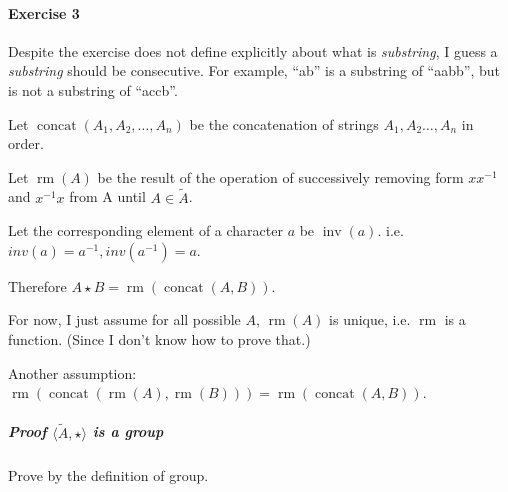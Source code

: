\documentclass[11pt]{article}
\begin{document}
\newpage
\paragraph{Exercise 3}

Despite the exercise does not define explicitly
about what is \textit{substring}, I guess a \textit{substring}
should be consecutive.
For example, ``ab'' is a substring of ``aabb'', but is not a substring of ``accb''.

Let $\mathop{concat}(A_1,A_2,\ldots,A_n)$ be the concatenation of strings
$A_1,A_2\ldots,A_n$ in order.

Let $\mathop{rm}(A)$ be the result of the operation of successively removing form $xx^{-1}$
and $x^{-1}x$ from A until $A \in \tilde{A}$.

Let the corresponding element of a character $a$ be $\mathop{inv}(a)$.
i.e. $inv(a) = a^{-1}, inv(a^{-1}) = a$.

Therefore $A \star B = \mathop{rm}(\mathop{concat}(A,B))$.

For now, I just assume for all possible $A$, $\mathop{rm}(A)$ is unique, i.e. $\mathop{rm}$
is a function. (Since I don't know how to prove that.)

Another assumption: $\mathop{rm}(\mathop{concat}(\mathop{rm}(A),\mathop{rm}(B)))
=\mathop{rm}(\mathop{concat}(A,B))$.

\subparagraph{Proof $\langle \tilde{A}, \star \rangle$ is a group}

Prove by the definition of group.
\end{document}
